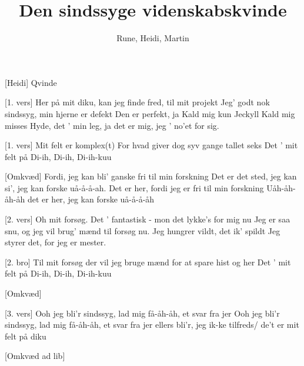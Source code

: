 \documentclass[a4paper,12pt]{article}
\title{Den sindssyge videnskabskvinde}
\author{Rune, Heidi, Martin}
\begin{document}
\maketitle

\begin{roles}
  [Heidi] Qvinde
\end{roles}

\begin{song}

[1. vers]
Her på mit diku, kan jeg finde fred, til mit projekt
Jeg' godt nok sindssyg, min hjerne er defekt
Den er perfekt, ja
Kald mig kun Jeckyll
Kald mig misses Hyde, det ' min leg, ja det er mig, jeg ' no'et for sig.

[1. vers]
Mit felt er komplex(t)
For hvad giver dog syv gange tallet seks
Det ' mit felt på Di-ih, Di-ih, Di-ih-kuu

[Omkvæd]
Fordi, jeg kan bli' ganske fri til min forskning
Det er det sted, jeg kan si', jeg kan forske uå-å-å-ah.
Det er her, fordi jeg er fri til min forskning
Uåh-åh-åh-åh det er her, jeg kan forske uå-å-å-åh


[2. vers]
Oh mit forsøg. Det ' fantastisk - mon det lykke's for mig nu
Jeg er saa snu, og jeg vil brug' mænd til forsøg nu.
Jeg hungrer vildt, det ik' spildt
Jeg styrer det, for jeg er mester.

[2. bro]
Til mit forsøg der vil jeg
bruge mænd for at spare hist og her
Det ' mit felt på Di-ih, Di-ih, Di-ih-kuu

[Omkvæd]

[3. vers]
Ooh jeg bli'r sindssyg, lad mig få-åh-åh, et svar fra jer
Ooh jeg bli'r sindssyg, lad mig få-åh-åh, et svar fra jer
ellers bli'r, jeg ik-ke tilfreds/ de't er mit felt på diku

[Omkvæd ad lib]

\end{song}
\end{document}
